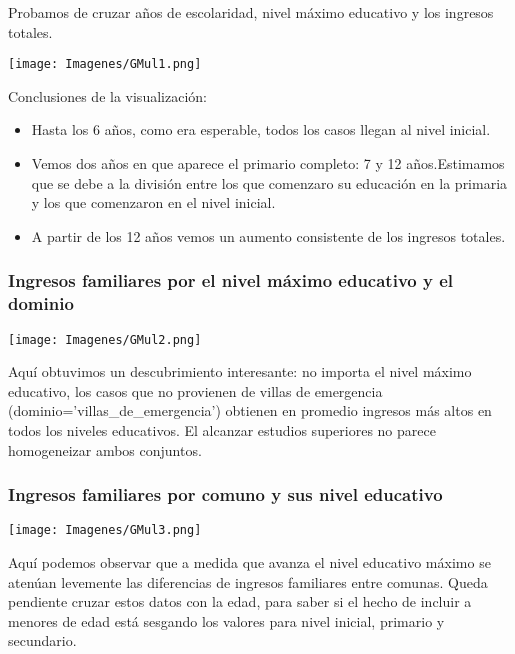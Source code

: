 \documentclass[a4paper]{article}
\begin{document}
            Probamos de cruzar años de escolaridad, nivel máximo educativo y los ingresos totales.

            \begin{center}
                \texttt{[image: Imagenes/GMul1.png]}
            \end{center}

            Conclusiones de la visualización:
            \begin{itemize}
                \item Hasta los 6 años, como era esperable, todos los casos llegan al nivel inicial.
                \item Vemos dos años en que aparece el primario completo: 7 y 12 años.Estimamos que se debe a la división entre los que comenzaro su educación en la primaria y los que comenzaron en el nivel inicial.
                \item A partir de los 12 años vemos un aumento consistente de los ingresos totales.
            \end{itemize}
        
        \begin{landscape}
            
        \subsubsection*{Ingresos familiares por el nivel máximo educativo y el dominio}

            \texttt{[image: Imagenes/GMul2.png]}

            Aquí obtuvimos un descubrimiento interesante: no importa el nivel máximo educativo, los casos que no provienen de villas de emergencia (dominio='villas\_de\_emergencia') obtienen en promedio ingresos más altos en todos los niveles educativos. El alcanzar estudios superiores no parece homogeneizar ambos conjuntos.

        \end{landscape}

        \subsubsection*{Ingresos familiares por comuno y sus nivel educativo}

            \texttt{[image: Imagenes/GMul3.png]}

            Aquí podemos observar que a medida que avanza el nivel educativo máximo se atenúan levemente las diferencias de ingresos familiares entre comunas. Queda pendiente cruzar estos datos con la edad, para saber si el hecho de incluir a menores de edad está sesgando los valores para nivel inicial, primario y secundario.
\end{document}
